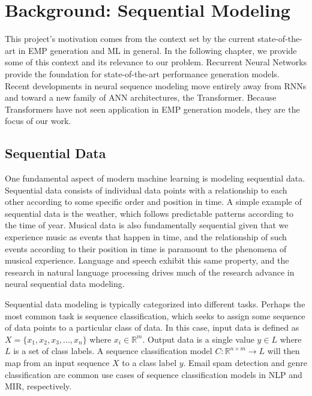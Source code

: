 \chapter{Background: Sequential Modeling}\label{ch:ch3}


This project's motivation comes from the context set by the current state-of-the-art in EMP generation and ML in general. In the following chapter, we provide some of this context and its relevance to our problem.  Recurrent Neural Networks provide the foundation for state-of-the-art performance generation models. Recent developments in neural sequence modeling move entirely away from RNNs and toward a new family of ANN architectures, the Transformer. Because Transformers have not seen application in EMP generation models, they are the focus of our work. 

\section{Sequential Data}\label{sec:sequential-data}
One fundamental aspect of modern machine learning is modeling sequential data. Sequential data consists of individual data points with a relationship to each other according to some specific order and position in time. A simple example of sequential data is the weather, which follows predictable patterns according to the time of year. Musical data is also fundamentally sequential\cite{widmer2016getting} given that we experience music as events that happen in time, and the relationship of such events according to their position in time is paramount to the phenomena of musical experience. Language and speech exhibit this same property, and the research in natural language processing drives much of the research advance in neural sequential data modeling. 

Sequential data modeling is typically categorized into different tasks. Perhaps the most common task is sequence classification, which seeks to assign some sequence of data points to a particular class of data. In this case, input data is defined as $X = \{x_1, x_2, x_3, ..., x_n\}$ where $x_i \in \mathbb{R}^m$. Output data is a single value $y \in L$ where $L$ is a set of class labels. A sequence classification model $C: \mathbb{R}^{n \times m} \rightarrow L$ will then map from an input sequence $X$ to a class label $y$. Email spam detection and genre classification are common use cases of sequence classification models in NLP and MIR, respectively. 

\newcommand{\seq}{\emph{seq2seq}}

